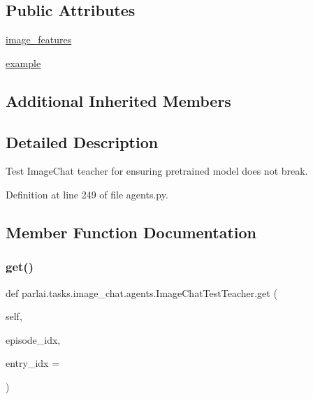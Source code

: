 \subsection*{Public Attributes}
\begin{DoxyCompactItemize}
\item 
\hyperlink{classparlai_1_1tasks_1_1image__chat_1_1agents_1_1ImageChatTestTeacher_a80425539c895043b514564eb38961bf6}{image\+\_\+features}
\item 
\hyperlink{classparlai_1_1tasks_1_1image__chat_1_1agents_1_1ImageChatTestTeacher_a7a723dab72ffcb3a7b39d0548fec9e79}{example}
\end{DoxyCompactItemize}
\subsection*{Additional Inherited Members}


\subsection{Detailed Description}
\begin{DoxyVerb}Test ImageChat teacher for ensuring pretrained model does not break.\end{DoxyVerb}
 

Definition at line 249 of file agents.\+py.



\subsection{Member Function Documentation}
\mbox{\label{classparlai_1_1tasks_1_1image__chat_1_1agents_1_1ImageChatTestTeacher_a62eff78b8f32b86c39804a644c3337f6}} 
\subsubsection{\texorpdfstring{get()}{get()}}
{\footnotesize\ttfamily def parlai.\+tasks.\+image\+\_\+chat.\+agents.\+Image\+Chat\+Test\+Teacher.\+get (\begin{DoxyParamCaption}\item[{}]{self,  }\item[{}]{episode\+\_\+idx,  }\item[{}]{entry\+\_\+idx = {} }\end{DoxyParamCaption})}


